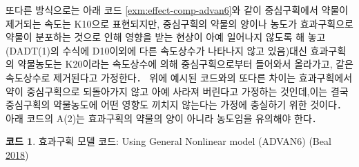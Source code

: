\documentclass[
  11pt,
  krantz2, a4paper, twoside]{krantz}
\newenvironment{Shaded}{\begin{snugshade}}{\end{snugshade}}
\newcommand{\DataTypeTok}[1]{\textcolor[rgb]{0.13,0.29,0.53}{#1}}
\newcommand{\DecValTok}[1]{\textcolor[rgb]{0.00,0.00,0.81}{#1}}
\newcommand{\NormalTok}[1]{#1}
\theoremstyle{definition}
\theoremstyle{definition}
\newtheorem{example}{코드}[chapter]
\theoremstyle{definition}
\theoremstyle{remark}
\begin{document}
\begin{Shaded}
\end{Shaded}

또다른 방식으로는 아래 코드 \ref{exm:effect-comp-advan6}와 같이 중심구획에서 약물이 제거되는 속도는 K10으로 표현되지만, 중심구획의 약물의 양이나 농도가 효과구획으로 약물이 분포하는 것으로 인해 영향을 받는 현상이 아예 일어나지 않도록 해 놓고(DADT(1)의 수식에 D10이외에 다른 속도상수가 나타나지 않고 있음)대신 효과구획의 약물농도는 K20이라는 속도상수에 의해 중심구획으로부터 들어와서 올라가고, 같은 속도상수로 제거된다고 가정한다． 위에 예시된 코드와의 또다른 차이는 효과구획에서 약이 중심구획으로 되돌아가지 않고 아예 사라져 버린다고 가정하는 것인데,이는 결국 중심구획의 약물농도에 어떤 영향도 끼치지 않는다는 가정에 충실하기 위한 것이다． 아래 코드의 A(2)는 효과구획의 약물의 양이 아니라 농도임을 유의해야 한다． 

\begin{example}
\protect\hypertarget{exm:effect-comp-advan6}{}{\label{exm:effect-comp-advan6} }효과구획 모델 코드: Using General Nonlinear model (ADVAN6) (Beal \protect\hyperlink{ref-nonmem}{2018})
\end{example}
\vspace{-5ex}
\end{document}
